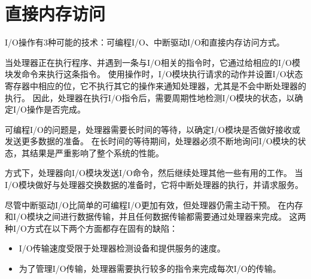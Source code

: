 
\section{直接内存访问}
{
    I/O操作有3种可能的技术：可编程I/O、中断驱动I/O和直接内存访问方式。

    当处理器正在执行程序、并遇到一条与I/O相关的指令时，它通过给相应的I/O模块发命令来执行这条指令。
    使用操作时，I/O模块执行请求的动作并设置I/O状态寄存器中相应的位，它不执行其它的操作来通知处理器，尤其是不会中断处理器的执行。
    因此，处理器在执行I/O指令后，需要周期性地检测I/O模块的状态，以确定I/O操作是否完成。

    可编程I/O的问题是，处理器需要长时间的等待，以确定I/O模块是否做好接收或发送更多数据的准备。
    在长时间的等待期间，处理器必须不断地询问I/O模块的状态，其结果是严重影响了整个系统的性能。

    方式下，处理器向I/O模块发送I/O命令，然后继续处理其他一些有用的工作。
    当I/O模块做好与处理器交换数据的准备时，它将中断处理器的执行，并请求服务。

    尽管中断驱动I/O比简单的可编程I/O更加有效，但处理器仍需主动干预。
    在内存和I/O模块之间进行数据传输，并且任何数据传输都需要通过处理器来完成。
    这两种I/O方式在以下两个方面都存在固有的缺陷：

    \begin{itemize}
        \item I/O传输速度受限于处理器检测设备和提供服务的速度。
        \item 为了管理I/O传输，处理器需要执行较多的指令来完成每次I/O的传输。
    \end{itemize}
}
